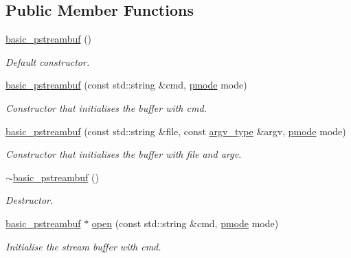 \subsection*{Public Member Functions}
\begin{DoxyCompactItemize}
\item 
\mbox{\hyperlink{classredi_1_1basic__pstreambuf_ae66decd83183a35608ada0a56cb8d97b}{basic\+\_\+pstreambuf}} ()
\begin{DoxyCompactList}\small\item\em Default constructor. \end{DoxyCompactList}\item 
\mbox{\hyperlink{classredi_1_1basic__pstreambuf_aff497d97764d0917274d3a3f775bbe0c}{basic\+\_\+pstreambuf}} (const std\+::string \&cmd, \mbox{\hyperlink{structredi_1_1pstreams_a1eae4aad88812af03a0fbb3ec13c50b7}{pmode}} mode)
\begin{DoxyCompactList}\small\item\em Constructor that initialises the buffer with {\itshape cmd}. \end{DoxyCompactList}\item 
\mbox{\hyperlink{classredi_1_1basic__pstreambuf_a7d5196b0eeb2747e77558f237c9ea185}{basic\+\_\+pstreambuf}} (const std\+::string \&file, const \mbox{\hyperlink{structredi_1_1pstreams_af902b894b095c1875e96c10129489467}{argv\+\_\+type}} \&argv, \mbox{\hyperlink{structredi_1_1pstreams_a1eae4aad88812af03a0fbb3ec13c50b7}{pmode}} mode)
\begin{DoxyCompactList}\small\item\em Constructor that initialises the buffer with {\itshape file} and {\itshape argv}. \end{DoxyCompactList}\item 
\mbox{\hyperlink{classredi_1_1basic__pstreambuf_a53d7cdeacc2f34a06d5b6be09498c1a1}{$\sim$basic\+\_\+pstreambuf}} ()
\begin{DoxyCompactList}\small\item\em Destructor. \end{DoxyCompactList}\item 
\mbox{\hyperlink{classredi_1_1basic__pstreambuf}{basic\+\_\+pstreambuf}} $\ast$ \mbox{\hyperlink{classredi_1_1basic__pstreambuf_ac91e4317d9e95b4551513a00e3d82996}{open}} (const std\+::string \&cmd, \mbox{\hyperlink{structredi_1_1pstreams_a1eae4aad88812af03a0fbb3ec13c50b7}{pmode}} mode)
\begin{DoxyCompactList}\small\item\em Initialise the stream buffer with {\itshape cmd}. \end{DoxyCompactList}\item 

\end{DoxyCompactItemize}
